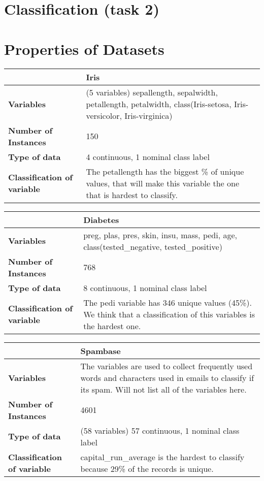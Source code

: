 \section{Classification (task 2)}

	\section*{Properties of Datasets}
	
	\begin{table}[H]
		\begin{tabular}{ p{4cm} | p{8cm} }
			\hline
			\rowcolor{gray}
			 & {\bf Iris} \\ \hline
			{\bf Variables} & (5 variables)
			sepallength, sepalwidth, petallength, petalwidth, 
			class(Iris-setosa, Iris-versicolor, Iris-virginica) \\ \hline
			{\bf Number of Instances} & 150 \\ \hline
			{\bf Type of data} & 4 continuous, 1 nominal class label\\ \hline
			{\bf Classification of variable} & The petallength has the biggest \% of unique 
			values, that will make this variable the one that is hardest to classify. \\ \hline
		\end{tabular}

		\begin{tabular}{ p{4cm} | p{8cm} }
			\hline
			\rowcolor{gray}
			 & {\bf Diabetes} \\ \hline
			{\bf Variables} & preg, plas, pres, skin, insu, mass, pedi, age, 
			class(tested\_negative, tested\_positive)	\\ \hline
			{\bf Number of Instances} & 768 \\ \hline
			{\bf Type of data} & 8 continuous, 1 nominal class label \\ \hline
			{\bf Classification of variable} & The pedi variable has 346 unique values (45\%).
			We think that a classification of this variables is the hardest one. \\ \hline
		\end{tabular}

		\begin{tabular}{ p{4cm} | p{8cm} }
			\hline
			\rowcolor{gray}
			 & {\bf Spambase} \\ \hline
			{\bf Variables} & The variables are used to collect frequently used words and characters
			used in emails to classify if its spam. Will not list all of the variables here.  \\ \hline
			{\bf Number of Instances} &  4601 \\ \hline 
			{\bf Type of data} & (58 variables) 57 continuous, 1 nominal class label \\ \hline
			{\bf Classification of variable} & capital\_run\_average is the hardest to classify because 29\%
			of the records is unique.  \\ \hline
		\end{tabular}
	\end{table}


